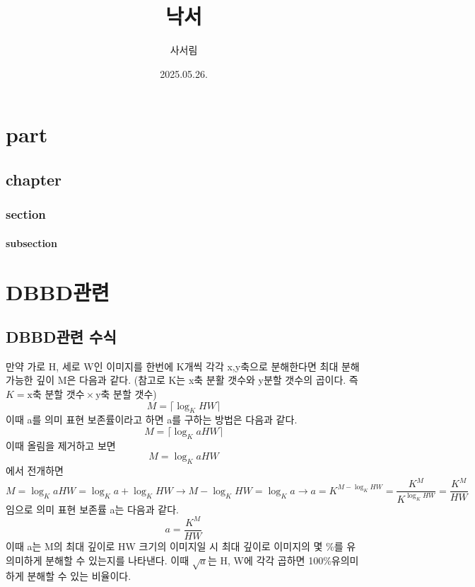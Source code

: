 \documentclass{book}
\title{낙서}
\author{사서림}
\date{2025.05.26.\text{\_\-\-\_}}
\begin{document}
\maketitle

\tableofcontents

\part{part}
\chapter{chapter}
\section{section}
\subsection{subsection}

\part{DBBD관련}

\chapter{DBBD관련 수식}
만약 가로 H, 세로 W인 이미지를 한번에 K개씩 각각 x,y축으로 분해한다면 최대 분해 가능한 깊이 M은 다음과 같다. (참고로 K는 x축 분활 갯수와 y분할 갯수의 곱이다. 즉 $K=\text{x축 분할 갯수}\times\text{y축 분할 갯수}$)
\[
M=\lceil \log_{K}HW \rceil
\]
이때 a를 의미 표현 보존률이라고 하면 a를 구하는 방법은 다음과 같다.
\[
M=\lceil \log_{K}aHW \rceil
\]
이때 올림을 제거하고 보면
\[
M=\log_{K}aHW
\]
에서 전개하면
\[
M=\log_{K}aHW=\log_{K}a+\log_{K}HW \rightarrow M-\log_{K}HW=\log_{K}a \rightarrow a=K^{M-\log_{K}HW}=\frac{K^M}{K^{\log_{K}HW}}=\frac{K^M}{HW}
\]
임으로 의미 표현 보존률 a는 다음과 같다.
\[
a=\frac{K^M}{HW}
\]
이때 a는 M의 최대 깊이로 HW 크기의 이미지일 시 최대 깊이로 이미지의 몇 \%를 유의미하게 분해할 수 있는지를 나타낸다. 이때 $\sqrt{a}\text{는}$ H, W에 각각 곱하면 100\%유의미하게 분해할 수 있는 비율이다.
\end{document}
